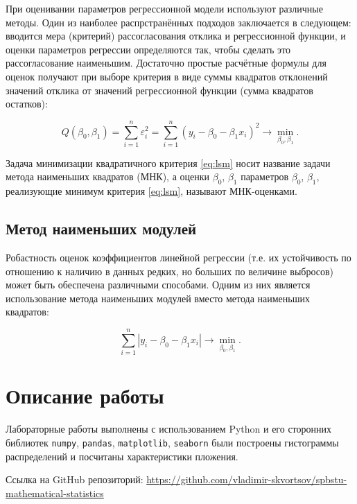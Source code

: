 \documentclass[12pt,a4paper]{article}
\begin{document}
	При оценивании параметров регрессионной модели используют различные
	методы. Один из наиболее распрстранённых подходов заключается в
	следующем: вводится мера (критерий) рассогласования отклика и
	регрессионной функции, и оценки параметров регрессии определяются так,
	чтобы сделать это рассогласование наименьшим. Достаточно простые
	расчётные формулы для оценок получают при выборе критерия в виде суммы
	квадратов отклонений значений отклика от значений регрессионной функции
	(сумма квадратов остатков):

	\begin{equation} \label{eq:lsm}
		Q(\beta_0, \beta_1) = \sum \limits_{i=1}^n \varepsilon_i^2 =
		\sum \limits_{i=1}^n (y_i - \beta_0 - \beta_1 x_i)^2 \rightarrow
		\min_{\beta_0, \beta_1}.
	\end{equation}

	Задача минимизации квадратичного критерия \eqref{eq:lsm} носит название
	задачи метода наименьших квадратов (МНК), а оценки \( \beta_0 \),
	\( \beta_1 \) параметров \( \beta_0 \), \( \beta_1 \), реализующие минимум
	критерия \eqref{eq:lsm}, называют МНК-оценками.

	\subsection{Метод наименьших модулей}

	Робастность оценок коэффициентов линейной регрессии (т.е. их
	устойчивость по отношению к наличию в данных редких, но больших по
	величине выбросов) может быть обеспечена различными способами. Одним из
	них является использование метода наименьших модулей вместо метода
	наименьших квадратов:

	\begin{equation} \label{eq:lam}
		\sum \limits_{i=1}^n |y_i - \beta_0 - \beta_1 x_i| \rightarrow
		\min_{\beta_0, \beta_1}.
	\end{equation}

	\section{Описание работы}
	Лабораторные работы выполнены с использованием Python и его сторонних
	библиотек \verb!numpy!, \verb!pandas!, \verb!matplotlib!, \verb!seaborn! были
	построены гистограммы распределений и посчитаны характеристики пложения.

	Ссылка на GitHub репозиторий:
	\href{https://github.com/vladimir-skvortsov/spbstu-mathematical-statistics}
	{https://github.com/vladimir-skvortsov/spbstu-mathematical-statistics}
\end{document}

